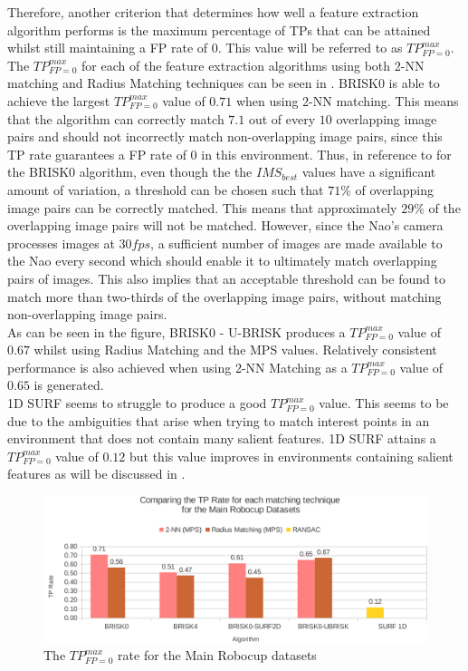 \documentclass[11pt]{report}
\begin{document}
Therefore, another criterion that determines how well a feature extraction algorithm performs is the maximum percentage of TPs that can be attained whilst still maintaining a FP rate of $0$. This value will be referred to as $TP_{FP=0}^{max}$.  \\

The $TP_{FP=0}^{max}$ for each of the feature extraction algorithms using both 2-NN matching and Radius Matching techniques can be seen in . BRISK0 is able to achieve the largest $TP_{FP=0}^{max}$ value of $0.71$ when using 2-NN matching. This means that the algorithm can correctly match $7.1$ out of every $10$ overlapping image pairs and should not incorrectly match non-overlapping image pairs, since this TP rate guarantees a FP rate of $0$ in this environment. Thus, in reference to  for the BRISK0 algorithm, even though the the $IMS_{best}$ values have a significant amount of variation, a threshold can be chosen such that $71\%$ of overlapping image pairs can be correctly matched. This means that approximately $29\%$ of the overlapping image pairs will not be matched. However, since the Nao's camera processes images at $30 fps$, a sufficient number of images are made available to the Nao every second which should enable it to ultimately match overlapping pairs of images. This also implies that an acceptable threshold can be found to match more than two-thirds of the overlapping image pairs, without matching non-overlapping image pairs.\\

As can be seen in the figure, BRISK0 - U-BRISK produces a $TP_{FP=0}^{max}$ value of $0.67$ whilst using Radius Matching and the MPS values. Relatively consistent performance is also achieved when using 2-NN Matching as a $TP_{FP=0}^{max}$ value of $0.65$ is generated.\\ 

1D SURF seems to struggle to produce a good $TP_{FP=0}^{max}$ value. This seems to be due to the ambiguities that arise when trying to match interest points in an environment that does not contain many salient features. 1D SURF attains a $TP_{FP=0}^{max}$ value of $0.12$ but this value improves in environments containing salient features as will be discussed in .\\

\begin{figure}
  \centering
    \includegraphics[width=1.0\textwidth]{../Drawings/Graphs/tp_rate_mrb.pdf}
    \caption{The $TP_{FP=0}^{max}$ rate for the Main Robocup datasets} 
    \label{fig:tp_rate_mrd}
\end{figure}
\end{document}
